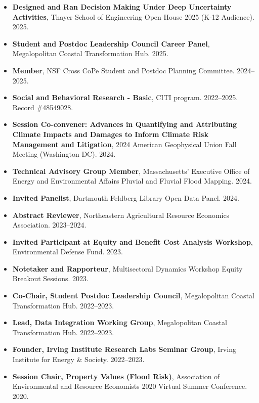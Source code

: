 \documentclass[10pt,oneside]{article}
\begin{document}
\begin{itemize}[label={}]
  
  \item \textbf{Designed and Ran Decision Making Under Deep Uncertainty Activities}, Thayer School of Engineering Open House 2025 (K-12 Audience). 2025.
  
  \item \textbf{Student and Postdoc Leadership Council Career Panel}, Megalopolitan Coastal Transformation Hub. 2025.
  
  \item \textbf{Member}, NSF Cross CoPe Student and Postdoc Planning Committee. 2024--2025.
  
  \item \textbf{Social and Behavioral Research - Basic}, CITI program. 2022--2025.\\Record \#48549028.
  
  \item \textbf{Session Co-convener: Advances in Quantifying and Attributing Climate Impacts and Damages to Inform Climate Risk Management and Litigation}, 2024 American Geophysical Union Fall Meeting (Washington DC). 2024.
  
  \item \textbf{Technical Advisory Group Member}, Massachusetts’ Executive Office of Energy and Environmental Affairs Pluvial and Fluvial Flood Mapping. 2024.
  
  \item \textbf{Invited Panelist}, Dartmouth Feldberg Library Open Data Panel. 2024.
  
  \item \textbf{Abstract Reviewer}, Northeastern Agricultural Resource Economics Association. 2023--2024.
  
  \item \textbf{Invited Participant at Equity and Benefit Cost Analysis Workshop}, Environmental Defense Fund. 2023.
  
  \item \textbf{Notetaker and Rapporteur}, Multisectoral Dynamics Workshop Equity Breakout Sessions. 2023.
  
  \item \textbf{Co-Chair, Student Postdoc Leadership Council}, Megalopolitan Coastal Transformation Hub. 2022--2023.
  
  \item \textbf{Lead, Data Integration Working Group}, Megalopolitan Coastal Transformation Hub. 2022--2023.
  
  \item \textbf{Founder, Irving Institute Research Labs Seminar Group}, Irving Institute for Energy \& Society. 2022--2023.
  
  \item \textbf{Session Chair, Property Values (Flood Risk)}, Association of Environmental and Resource Economists 2020 Virtual Summer Conference. 2020.
  
\end{itemize}
\end{document}
